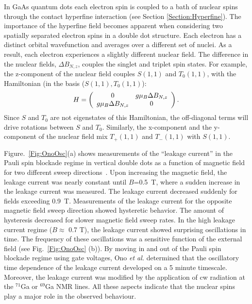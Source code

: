 \documentclass[12pt,aps,nofootinbib]{revtex4-1}
\begin{document}
In GaAs quantum dots each electron spin is coupled to a bath of
nuclear spins through the contact hyperfine interaction (see
Section \ref{Section:Hyperfine}). The importance of the hyperfine
field becomes apparent when considering two spatially separated
electron spins in a double dot structure. Each electron has a
distinct orbital wavefunction and averages over a different set of
nuclei. As a result, each electron experiences a slightly
different nuclear field. The difference in the nuclear fields,
$\Delta$$B_{N,z}$, couples the singlet and triplet spin states. For
example, the z-component of the nuclear field couples $S(1,1)$ and
$T_0(1,1)$, with the Hamiltonian (in the basis ($S(1,1), T_0(1,1)$):
\begin{equation}
H= \left(\begin{array}{c c}
0 & g \mu_B \Delta B_{N,z}\\
g \mu_B \Delta B_{N,z} & 0 \end{array}\right).
\end{equation}
Since $S$ and $T_0$ are not eigenstates of this Hamiltonian, the off-diagonal terms will drive rotations between $S$ and $T_0$.
Similarly, the x-component and the y-component of the nuclear
field mix $T_+(1,1)$ and $T_-(1,1)$ with $S(1,1)$.

Figure.~\ref{Fig:OnoOsc}(a) shows measurements of the ``leakage
current'' in the Pauli spin blockade regime in vertical double dots
as a function of magnetic field for two different sweep
directions~\cite{OnoPRL2004}. Upon increasing the magnetic field,
the leakage current was nearly constant until $B$=0.5~T, where a
sudden increase in the leakage current was measured. The leakage
current decreased suddenly for fields exceeding 0.9~T.
Measurements of the leakage current for the opposite magnetic
field sweep direction showed hysteretic behavior. The amount of
hysteresis decreased for slower magnetic field sweep rates. In the
high leakage current regime ($B\approx$ 0.7 T), the leakage
current showed surprising oscillations in time. The frequency of
these oscillations was a sensitive function of the external field
(see Fig.\ \ref{Fig:OnoOsc} (b)). By moving in and out of the
Pauli spin blockade regime using gate voltages, Ono \textit{et
al.} determined that the oscillatory time dependence of the
leakage current developed on a 5 minute timescale. Moreover, the
leakage current was modified by the application of cw radiation at
the $^{71}$Ga or $^{69}$Ga NMR lines. All these aspects indicate
that the nuclear spins play a major role in the observed
behaviour.
\end{document}
